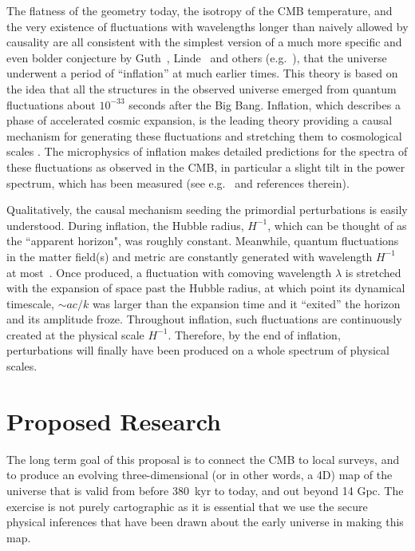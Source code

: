 \documentclass[psfig,11pt]{article}
\def\ni{\noindent}
\begin{document}
\ni{\bf Inflation:}
The flatness of the geometry today, the isotropy of the CMB temperature, and the very existence of fluctuations with wavelengths longer than naively allowed by causality are all consistent with the simplest version of a much more specific and even bolder conjecture by Guth~\cite{Guth1981}, Linde~\cite{Linde1982a} and others (e.g.~\cite{%
 Mukhanov:1981xt, Sato1981, Hawking1982, Starobinsky1982, Albrecht1982, %
  Bardeen1983%
  }), that the universe underwent a period of ``inflation'' at much earlier times. This theory is based on the idea that all the structures in the observed universe emerged from quantum fluctuations about $10^{-33}$ seconds after the Big Bang. Inflation, which describes a phase of accelerated cosmic expansion, is the leading theory providing a causal mechanism for generating these fluctuations and stretching them to cosmological scales%
. The microphysics of inflation makes detailed predictions for the spectra of these fluctuations as observed in the CMB, in particular a slight tilt in the power spectrum, which has been measured (see e.g.~\cite{Malik2008, Gordon2000} and references therein).

Qualitatively, the causal mechanism seeding the primordial perturbations is easily understood. During inflation, the Hubble radius, $H^{-1}$, which can be thought of as the ``apparent horizon", was roughly constant. Meanwhile, quantum fluctuations in the matter field(s) and metric are constantly generated with wavelength $H ^{-1}$ at most~\cite{BirrellsBook1984}. Once produced, a fluctuation with comoving wavelength $\lambda$ is stretched with the expansion of space past the Hubble radius, at which point its dynamical timescale, $\sim ac/k$ was larger than the expansion time and it ``exited'' the horizon and its amplitude froze.  Throughout inflation, such fluctuations are continuously created at the physical scale $H^{-1}$. Therefore, by the end of inflation, perturbations will finally have been produced on a whole spectrum of physical scales.




\section{Proposed Research}
The long term goal of this proposal is to connect the CMB to local surveys, and to produce an evolving three-dimensional (or in other words, a 4D) map of the universe that is valid from before 380~kyr to today, and out beyond 14 Gpc. The exercise is not purely cartographic as it is essential that we use the secure physical inferences that have been drawn about the early universe in making this map.
\end{document}
